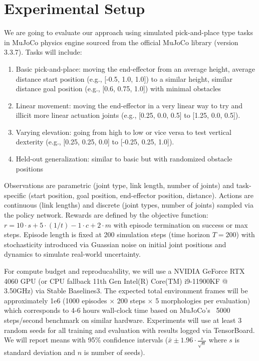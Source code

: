 \documentclass[conference]{IEEEtran}
\begin{document}
\section{Experimental Setup}
We are going to evaluate our approach using simulated pick-and-place type tasks in MuJoCo physics engine sourced from the official MuJoCo library (version 3.3.7).
Tasks will include:
\begin{enumerate}
    \item Basic pick-and-place: moving the end-effector from an average height, average distance start position (e.g., [-0.5, 1.0, 1.0]) to a similar height, similar distance goal position (e.g., [0.6, 0.75, 1.0]) with minimal obstacles
    \item Linear movement: moving the end-effector in a very linear way to try and illicit more linear actuation joints (e.g., [0.25, 0.0, 0.5] to [1.25, 0.0, 0.5]).
    \item Varying elevation: going from high to low or vice versa to test vertical dexterity (e.g., [0.25, 0.25, 0.0] to [-0.25, 0.25, 1.0]).
    \item Held-out generalization: similar to basic but with randomized obstacle positions
\end{enumerate}

Observations are parametric (joint type, link length, number of joints) and task-specific (start position, goal position, end-effector position, distance). 
Actions are continuous (link lengths) and discrete (joint types, number of joints) sampled via the policy network.
Rewards are defined by the objective function: $r = 10 \cdot s + 5 \cdot (1 / t) - 1 \cdot c + 2 \cdot m$ with episode termination on success or max steps.
Episode length is fixed at 200 simulation steps (time horizon $T=200$) with stochasticity introduced via Guassian noise on initial joint positions and dynamics to simulate real-world uncertainty.

For compute budget and reproducability, we will use a NVIDIA GeForce RTX 4060 GPU (or CPU fallback 11th Gen Intel(R) Core(TM) i9-11900KF @ 3.50GHz) via Stable Baselines3.
The expected total environment frames will be approximately 1e6 (1000 episodes $\times$ 200 steps $\times$ 5 morphologies per evaluation) which corresponds to 4-6 hours wall-clock time based on MuJoCo's ~5000 steps/second benchmark on similar hardware.
Experiments will use at least 3 random seeds for all training and evaluation with results logged via TensorBoard.
We will report means with 95\% confidence intervals ($\bar{x} \pm 1.96 \cdot \frac{s}{\sqrt{n}}$ where $s$ is standard deviation and $n$ is number of seeds). 
\end{document}
